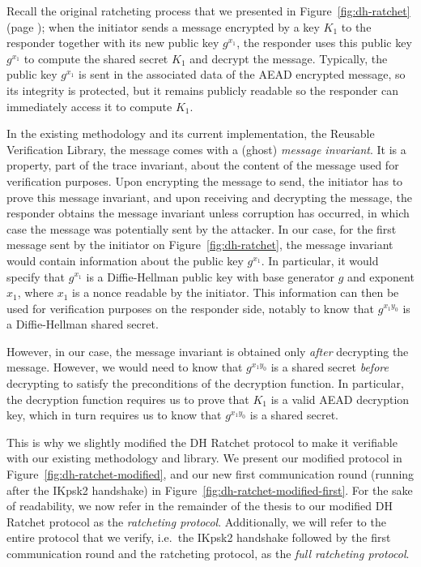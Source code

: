 Recall the original ratcheting process that we presented in Figure~\ref{fig:dh-ratchet} (page \pageref{fig:dh-ratchet}); when the initiator sends a message encrypted by a key $K_1$ to the responder together with its new public key $g^{x_1}$, the responder uses this public key $g^{x_1}$ to compute the shared secret $K_1$ and decrypt the message.
Typically, the public key $g^{x_1}$ is sent in the associated data of the AEAD encrypted message, so its integrity is protected, but it remains publicly readable so the responder can immediately access it to compute $K_1$.

In the existing methodology and its current implementation, the Reusable Verification Library, the message comes with a (ghost) \emph{message invariant}. It is a property, part of the trace invariant, about the content of the message used for verification purposes. Upon encrypting the message to send, the initiator has to prove this message invariant, and upon receiving and decrypting the message, the responder obtains the message invariant unless corruption has occurred, in which case the message was potentially sent by the attacker.
In our case, for the first message sent by the initiator on Figure~\ref{fig:dh-ratchet}, the message invariant would contain information about the public key $g^{x_1}$. In particular, it would specify that $g^{x_1}$ is a Diffie-Hellman public key with base generator $g$ and exponent $x_1$, where $x_1$ is a nonce readable by the initiator.
This information can then be used for verification purposes on the responder side, notably to know that $g^{x_1y_0}$ is a Diffie-Hellman shared secret.

However, in our case, the message invariant is obtained only \emph{after} decrypting the message.
However, we would need to know that $g^{x_1y_0}$ is a shared secret \emph{before} decrypting to satisfy the preconditions of the decryption function.
In particular, the decryption function requires us to prove that $K_1$ is a valid AEAD decryption key, which in turn requires us to know that $g^{x_1y_0}$ is a shared secret.

This is why we slightly modified the DH Ratchet protocol to make it verifiable with our existing methodology and library.
We present our modified protocol in Figure~\ref{fig:dh-ratchet-modified}, and our new first communication round (running after the IKpsk2 handshake) in Figure~\ref{fig:dh-ratchet-modified-first}.
For the sake of readability, we now refer in the remainder of the thesis to our modified DH Ratchet protocol as the \emph{ratcheting protocol}. Additionally, we will refer to the entire protocol that we verify, i.e.\ the IKpsk2 handshake followed by the first communication round and the ratcheting protocol, as the \emph{full ratcheting protocol}.

